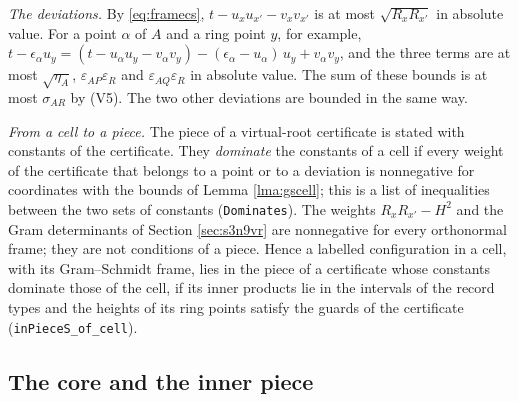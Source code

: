 \documentclass[reqno,a4paper,11pt]{amsart}
\numberwithin{equation}{section}
\newcommand{\lean}[1]{\texttt{#1}}
\begin{document}
\emph{The deviations.} By \eqref{eq:framecs}, $t - u_x u_{x'} - v_x v_{x'}$ is at most $\sqrt{R_x R_{x'}}$ in absolute value. For a point $\alpha$ of $A$ and a ring point $y$, for example, $t - \epsilon_\alpha u_y = (t - u_\alpha u_y - v_\alpha v_y) - (\epsilon_\alpha - u_\alpha) \, u_y + v_\alpha v_y$, and the three terms are at most $\sqrt{\eta_A}$, $\varepsilon_{AP} \varepsilon_R$ and $\varepsilon_{AQ} \varepsilon_R$ in absolute value. The sum of these bounds is at most $\sigma_{AR}$ by (V5). The two other deviations are bounded in the same way.

\emph{From a cell to a piece.} The piece of a virtual-root certificate is stated with constants of the certificate. They \emph{dominate} the constants of a cell if every weight of the certificate that belongs to a point or to a deviation is nonnegative for coordinates with the bounds of Lemma \ref{lma:gscell}; this is a list of inequalities between the two sets of constants (\lean{Dominates}). The weights $R_x R_{x'} - H^2$ and the Gram determinants of Section \ref{sec:s3n9vr} are nonnegative for every orthonormal frame; they are not conditions of a piece. Hence a labelled configuration in a cell, with its Gram--Schmidt frame, lies in the piece of a certificate whose constants dominate those of the cell, if its inner products lie in the intervals of the record types and the heights of its ring points satisfy the guards of the certificate (\lean{inPieceS\_of\_cell}).

\subsection{The core and the inner piece}\label{sec:core}
\end{document}
